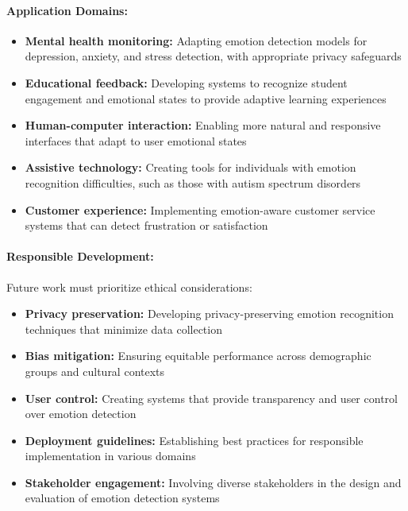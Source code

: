 \documentclass[12pt]{article}
\begin{document}
\paragraph{Application Domains:}
\begin{itemize}
    \item \textbf{Mental health monitoring:} Adapting emotion detection models for depression, anxiety, and stress detection, with appropriate privacy safeguards
    
    \item \textbf{Educational feedback:} Developing systems to recognize student engagement and emotional states to provide adaptive learning experiences
    
    \item \textbf{Human-computer interaction:} Enabling more natural and responsive interfaces that adapt to user emotional states
    
    \item \textbf{Assistive technology:} Creating tools for individuals with emotion recognition difficulties, such as those with autism spectrum disorders
    
    \item \textbf{Customer experience:} Implementing emotion-aware customer service systems that can detect frustration or satisfaction
\end{itemize}

\paragraph{Responsible Development:}
Future work must prioritize ethical considerations:

\begin{itemize}
    \item \textbf{Privacy preservation:} Developing privacy-preserving emotion recognition techniques that minimize data collection
    
    \item \textbf{Bias mitigation:} Ensuring equitable performance across demographic groups and cultural contexts
    
    \item \textbf{User control:} Creating systems that provide transparency and user control over emotion detection
    
    \item \textbf{Deployment guidelines:} Establishing best practices for responsible implementation in various domains
    
    \item \textbf{Stakeholder engagement:} Involving diverse stakeholders in the design and evaluation of emotion detection systems
\end{itemize}
\end{document}
